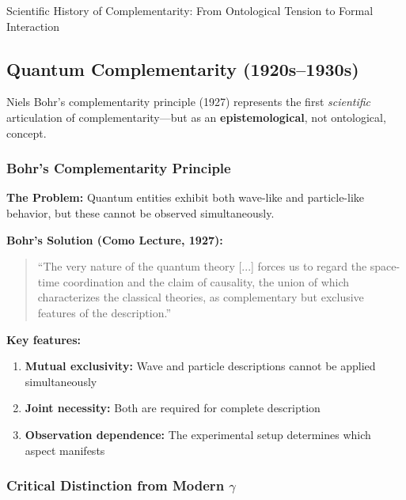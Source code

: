 \begin{chapter}{Scientific History of Complementarity: From Ontological Tension to Formal Interaction}
\subsection{Quantum Complementarity (1920s--1930s)}

\begin{tcolorbox}[colback=green!5!white,colframe=green!75!black,title=\textbf{Historical Turning Point}]
Niels Bohr's complementarity principle (1927) represents the first \textit{scientific} articulation of complementarity---but as an \textbf{epistemological}, not ontological, concept.
\end{tcolorbox}

\subsubsection{Bohr's Complementarity Principle}

\textbf{The Problem:} Quantum entities exhibit both wave-like and particle-like behavior, but these cannot be observed simultaneously.

\textbf{Bohr's Solution (Como Lecture, 1927):}

\begin{quote}
``The very nature of the quantum theory [...] forces us to regard the space-time coordination and the claim of causality, the union of which characterizes the classical theories, as complementary but exclusive features of the description.''
\end{quote}

\textbf{Key features:}
\begin{enumerate}
    \item \textbf{Mutual exclusivity:} Wave and particle descriptions cannot be applied simultaneously
    \item \textbf{Joint necessity:} Both are required for complete description
    \item \textbf{Observation dependence:} The experimental setup determines which aspect manifests
\end{enumerate}

\subsubsection{Critical Distinction from Modern $\gamma$}


\end{chapter}
